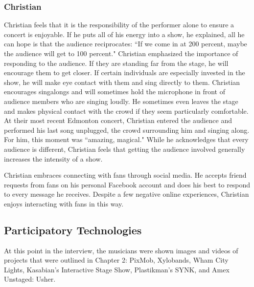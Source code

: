 \subsubsection{Christian}
Christian feels that it is the responsibility of the performer alone to ensure a concert is enjoyable. If he puts all of his energy into a show, he explained, all he can hope is that the audience reciprocates: ``If we come in at 200 percent, maybe the audience will get to 100 percent." Christian emphasized the importance of responding to the audience. If they are standing far from the stage, he will encourage them to get closer. If certain individuals are especially invested in the show, he will make eye contact with them and sing directly to them. Christian encourages singalongs and will sometimes hold the microphone in front of audience members who are singing loudly. He sometimes even leaves the stage and makes physical contact with the crowd if they seem particularly comfortable. At their most recent Edmonton concert, Christian entered the audience and performed his last song unplugged, the crowd surrounding him and singing along. For him, this moment was ``amazing, magical." While he acknowledges that every audience is different, Christian feels that getting the audience involved generally increases the intensity of a show.

Christian embraces connecting with fans through social media. He accepts friend requests from fans on his personal Facebook account and does his best to respond to every message he receives. Despite a few negative online experiences, Christian enjoys interacting with fans in this way.

\subsection{Participatory Technologies}

At this point in the interview, the musicians were shown images and videos of projects that were outlined in Chapter 2: PixMob, Xylobands, Wham City Lights, Kasabian's Interactive Stage Show, Plastikman's SYNK, and Amex Unstaged: Usher.

